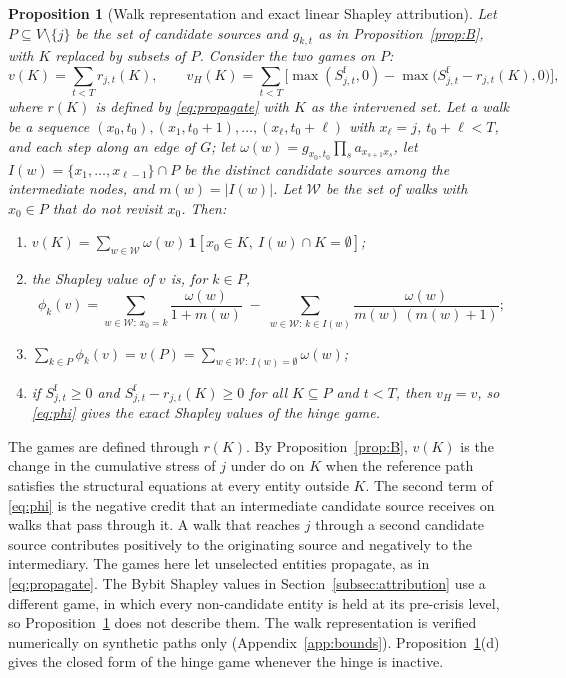 \documentclass[referee,pdflatex,sn-mathphys-ay]{sn-jnl}
\theoremstyle{thmstyleone}%
\newtheorem{proposition}[theorem]{Proposition}%
\theoremstyle{thmstyletwo}%
\theoremstyle{thmstylethree}%
\newcommand{\doop}{\mathrm{do}}
\begin{document}
\begin{proposition}[Walk representation and exact linear Shapley attribution]
\label{prop:C}
Let $P\subseteq V\setminus\{j\}$ be the set of candidate sources and $g_{k,t}$ as in
Proposition~\ref{prop:B}, with $K$ replaced by subsets of $P$. Consider the two games
on $P$:
\[
v(K)=\sum_{t<T} r_{j,t}(K),
\qquad
v_H(K)=\sum_{t<T}\Big[\max(S^{\mathrm f}_{j,t},0)-\max\big(S^{\mathrm f}_{j,t}-r_{j,t}(K),0\big)\Big],
\]
where $r(K)$ is defined by \eqref{eq:propagate} with $K$ as the intervened set. Let a
\emph{walk} be a sequence $(x_0,t_0),(x_1,t_0+1),\dots,(x_\ell,t_0+\ell)$ with
$x_\ell=j$, $t_0+\ell<T$, and each step along an edge of $G$; let $\omega(w)=g_{x_0,t_0}\prod_{s}a_{x_{s+1}x_s}$, let
$I(w)=\{x_1,\dots,x_{\ell-1}\}\cap P$ be the distinct candidate sources among the
intermediate nodes, and $m(w)=|I(w)|$. Let $\mathcal{W}$ be the set of walks with
$x_0\in P$ that do not revisit $x_0$. Then:
\begin{enumerate}[label=(\alph*),leftmargin=*]
\item $v(K)=\sum_{w\in\mathcal W}\omega(w)\,\mathbf 1[x_0\in K,\ I(w)\cap K=\emptyset]$;
\item the Shapley value of $v$ is, for $k\in P$,
\begin{equation}
\label{eq:phi}
\phi_k(v)=\sum_{w\in\mathcal W:\,x_0=k}\frac{\omega(w)}{1+m(w)}
\;-\;\sum_{w\in\mathcal W:\,k\in I(w)}\frac{\omega(w)}{m(w)\,(m(w)+1)};
\end{equation}
\item $\sum_{k\in P}\phi_k(v)=v(P)=\sum_{w\in\mathcal W:\,I(w)=\emptyset}\omega(w)$;
\item if $S^{\mathrm f}_{j,t}\ge0$ and $S^{\mathrm f}_{j,t}-r_{j,t}(K)\ge0$ for all $K\subseteq P$
and $t<T$, then $v_H=v$, so \eqref{eq:phi} gives the exact Shapley values of the hinge game.
\end{enumerate}
\end{proposition}

The games are defined through $r(K)$. By Proposition~\ref{prop:B}, $v(K)$ is the change in the
cumulative stress of $j$ under $\doop$ on $K$ when the reference path satisfies the structural
equations at every entity outside $K$.
The second term of \eqref{eq:phi} is the negative credit that an intermediate candidate
source receives on walks that pass through it. A walk that reaches $j$ through a second
candidate source contributes positively to the originating source and negatively to the
intermediary. The games here let unselected entities propagate, as in \eqref{eq:propagate}.
The Bybit Shapley values in Section~\ref{subsec:attribution} use a different game, in which every
non-candidate entity is held at its pre-crisis level, so Proposition~\ref{prop:C} does not
describe them. The walk representation is verified numerically on synthetic paths only
(Appendix~\ref{app:bounds}). Proposition~\ref{prop:C}(d) gives the closed form of the hinge game whenever the hinge is inactive.
\end{document}
